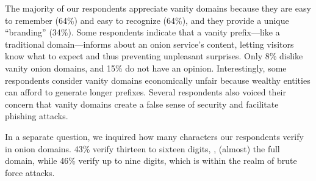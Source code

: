 The majority of our respondents appreciate vanity domains because they are easy
to remember (64\%) and easy to recognize (64\%), and they provide a unique
``branding'' (34\%).  Some respondents indicate that a vanity prefix---like a
traditional domain---informs about an onion service's content, letting visitors
know what to expect and thus preventing unpleasant surprises.  Only 8\% dislike
vanity onion domains, and 15\% do not have an opinion.  Interestingly, some
respondents consider vanity domains economically unfair because wealthy entities
can afford to generate longer prefixes.  Several respondents also voiced their
concern that vanity domains create a false sense of security and facilitate
phishing attacks.

In a separate question, we inquired how many characters our respondents verify in
onion domains.  43\% verify thirteen to sixteen digits, \ie, (almost) the full
domain, while 46\% verify up to nine digits, which is within the realm of brute
force attacks.
